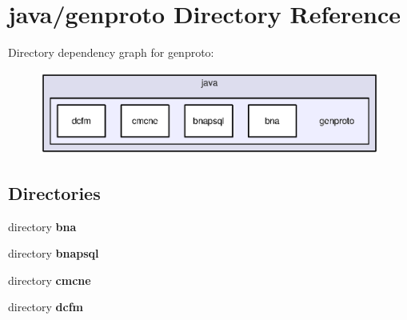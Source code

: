 \section{java/genproto Directory Reference}
\label{dir_0e43b3eaa74cb4b3a4cbe492a3c2d8cb}
Directory dependency graph for genproto\+:
\nopagebreak
\begin{figure}[H]
\begin{center}
\leavevmode
\includegraphics[width=350pt]{dir_0e43b3eaa74cb4b3a4cbe492a3c2d8cb_dep}
\end{center}
\end{figure}
\subsection*{Directories}
\begin{DoxyCompactItemize}
\item 
directory {\bf bna}
\item 
directory {\bf bnapsql}
\item 
directory {\bf cmcne}
\item 
directory {\bf dcfm}
\end{DoxyCompactItemize}

